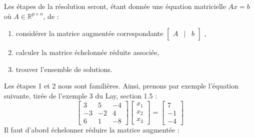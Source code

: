 \documentclass{article}
\newcommand{\R}{\mathbb{R}}
\newcommand{\cross}{\times}
\begin{document}
\noindent Les étapes de la résolution seront, étant donnée une équation matricielle $Ax = b$ où $A \in \R^{p \cross n}$, de :
\begin{enumerate}
    \item considérer la matrice augmentée correspondante $\begin{bmatrix}
A & | & b
\end{bmatrix}$ ,
\item calculer la matrice échelonnée réduite associée,
\item trouver l'ensemble de solutions.
\end{enumerate}
Les étapes 1 et 2 nous sont familières. Ainsi, prenons par exemple l'équation suivante, tirée de l'exemple 3 du Lay, section 1.5 :
$$
\begin{bmatrix}
3 & 5 & -4 \\
-3 & -2 & 4\\
6 & 1 & -8
\end{bmatrix}
\begin{bmatrix}
x_1 \\ x_2 \\ x_3
\end{bmatrix}
=
\begin{bmatrix}
7 \\ -1 \\ -4
\end{bmatrix}
$$
Il faut d'abord échelonner réduire la matrice augmentée :
\end{document}
